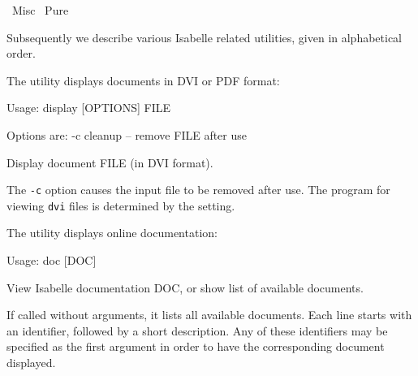 %
\begin{isabellebody}%
\def\isabellecontext{Misc}%
%
\isadelimtheory
\isanewline
\isanewline
%
\endisadelimtheory
%
\isatagtheory
{}\isamarkupfalse%
\ Misc\isanewline
{}\ Pure\isanewline
{}%
\endisatagtheory
{\isafoldtheory}%
%
\isadelimtheory
%
\endisadelimtheory
%
\isamarkuptrue%
%
\begin{isamarkuptext}%
Subsequently we describe various Isabelle related utilities, given
  in alphabetical order.%
\end{isamarkuptext}%
\isamarkuptrue%
%
\isamarkuptrue%
%
\begin{isamarkuptext}%
The \hypertarget{tool.display}{\hyperlink{tool.display}{\mbox{}}} utility displays documents in DVI or PDF
  format:
\begin{ttbox}
Usage: display [OPTIONS] FILE

  Options are:
    -c           cleanup -- remove FILE after use

  Display document FILE (in DVI format).
\end{ttbox}

  \medskip The \verb|-c| option causes the input file to be
  removed after use.  The program for viewing \verb|dvi| files is
  determined by the \hyperlink{setting.DVI-VIEWER}{\mbox{}} setting.%
\end{isamarkuptext}%
\isamarkuptrue%
%
\isamarkuptrue%
%
\begin{isamarkuptext}%
The \hypertarget{tool.doc}{\hyperlink{tool.doc}{\mbox{}}} utility displays online documentation:
\begin{ttbox}
Usage: doc [DOC]

  View Isabelle documentation DOC, or show list of available documents.
\end{ttbox}
  If called without arguments, it lists all available documents. Each
  line starts with an identifier, followed by a short description. Any
  of these identifiers may be specified as the first argument in order
  to have the corresponding document displayed.


\end{isamarkuptext}
\end{isabellebody}
